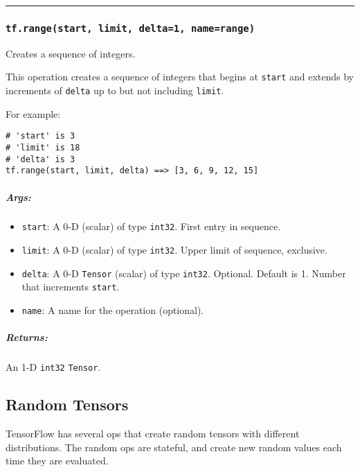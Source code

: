 \begin{center}\rule{0.5\linewidth}{\linethickness}\end{center}

\subsubsection{\texorpdfstring{\texttt{tf.range(start,\ limit,\ delta=1,\ name=\textquotesingle{}range\textquotesingle{})}
}{tf.range(start, limit, delta=1, name='range') }}\label{tf.rangestart-limit-delta1-namerange}

Creates a sequence of integers.

This operation creates a sequence of integers that begins at
\texttt{start} and extends by increments of \texttt{delta} up to but not
including \texttt{limit}.

For example:

\begin{verbatim}
# 'start' is 3
# 'limit' is 18
# 'delta' is 3
tf.range(start, limit, delta) ==> [3, 6, 9, 12, 15]
\end{verbatim}

\subparagraph{Args: }\label{args-7}

\begin{itemize}
\tightlist
\item
  \texttt{start}: A 0-D (scalar) of type \texttt{int32}. First entry in
  sequence.
\item
  \texttt{limit}: A 0-D (scalar) of type \texttt{int32}. Upper limit of
  sequence, exclusive.
\item
  \texttt{delta}: A 0-D \texttt{Tensor} (scalar) of type \texttt{int32}.
  Optional. Default is 1. Number that increments \texttt{start}.
\item
  \texttt{name}: A name for the operation (optional).
\end{itemize}

\subparagraph{Returns: }\label{returns-7}

An 1-D \texttt{int32} \texttt{Tensor}.

\subsection{Random Tensors }\label{random-tensors}

TensorFlow has several ops that create random tensors with different
distributions. The random ops are stateful, and create new random values
each time they are evaluated.

